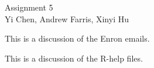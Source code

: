 \documentclass[12pt]{article}
\begin{document}
\begin{center} Assignment 5 \\ Yi Chen, Andrew Farris, Xinyi Hu \end{center}


\smallskip

This is a discussion of the Enron emails.





This is a discussion of the R-help files.
\end{document}
